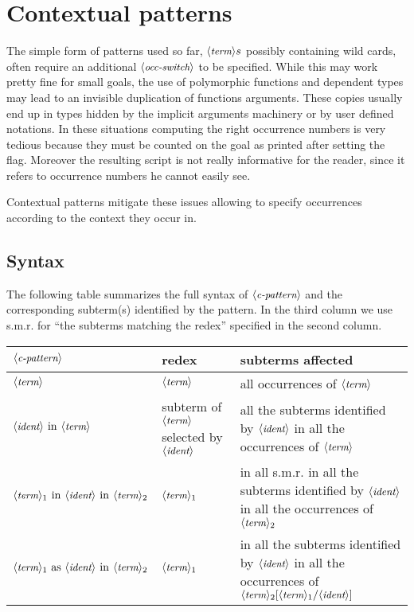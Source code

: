 \section{Contextual patterns}
\label{ssec:rewp}

The simple form of patterns used so far, $\langle\mbox{\itshape\rmfamily\small term}\rangle s$ possibly containing
wild cards, often require an additional $\langle\mbox{\itshape\rmfamily\small occ-switch}\rangle$ to be specified.
While this may work pretty fine for small goals, the use of polymorphic
functions and dependent types may lead to an invisible duplication of functions
arguments. These copies usually end up in types hidden by the implicit
arguments machinery or by user defined notations.  In these situations
computing the right occurrence numbers is very tedious because they must be
counted on the goal as printed after setting the  flag.
Moreover the resulting script is not really informative for the reader, since
it refers to occurrence numbers he cannot easily see.

Contextual patterns mitigate these issues allowing to specify occurrences
according to the context they occur in.

\subsection{Syntax}

The following table summarizes the full syntax of
$\langle\mbox{\itshape\rmfamily\small c-pattern}\rangle$ and the corresponding subterm(s) identified
by the pattern.
In the third column we use s.m.r. for
``the subterms matching the redex'' specified in the second column.

\begin{center}
\begin{tabularx}{\textwidth}{>{\arraybackslash}m{}|>{\arraybackslash}m{}|>{\arraybackslash}m{}}
$\langle\mbox{\itshape\rmfamily\small c-pattern}\rangle$ & redex & subterms affected \\
\hline
$\langle\mbox{\itshape\rmfamily\small term}\rangle$ & $\langle\mbox{\itshape\rmfamily\small term}\rangle$ & all occurrences of $\langle\mbox{\itshape\rmfamily\small term}\rangle$\\
\hline
$\N{ident}\ \C{in}\ \N{term}$ &
  subterm of $\langle\mbox{\itshape\rmfamily\small term}\rangle$ selected by $\langle\mbox{\itshape\rmfamily\small ident}\rangle$ &
  all the subterms identified by $\langle\mbox{\itshape\rmfamily\small ident}\rangle$ in all
  the occurrences of $\langle\mbox{\itshape\rmfamily\small term}\rangle$ \\
\hline
$\N{term}_1\ \C{in}\ \N{ident}\ \C{in}\ \N{term}_2$ & $\langle\mbox{\itshape\rmfamily\small term}\rangle_1$ &
  in all  s.m.r. in all the subterms identified by $\langle\mbox{\itshape\rmfamily\small ident}\rangle$ in all
  the occurrences of $\langle\mbox{\itshape\rmfamily\small term}\rangle_2$ \\
\hline
$\N{term}_1\ \C{as}\ \N{ident}\ \C{in}\ \N{term}_2$ & $\langle\mbox{\itshape\rmfamily\small term}\rangle_1$ &
  in all the subterms identified by $\langle\mbox{\itshape\rmfamily\small ident}\rangle$ in all
  the occurrences of $\langle\mbox{\itshape\rmfamily\small term}\rangle_2[\langle\mbox{\itshape\rmfamily\small term}\rangle_1/\langle\mbox{\itshape\rmfamily\small ident}\rangle]$\\
\hline
\end{tabularx}
\end{center}

